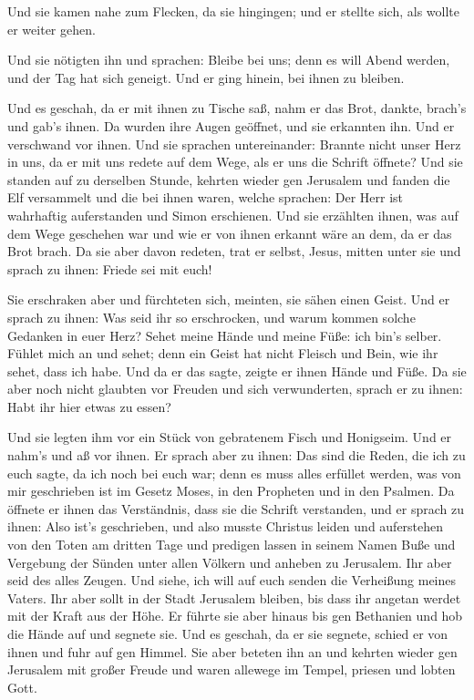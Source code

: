  Und sie kamen nahe zum Flecken, da sie hingingen; und er
stellte sich, als wollte er weiter gehen.

 Und sie nötigten ihn und sprachen: Bleibe bei uns; denn
es will Abend werden, und der Tag hat sich geneigt. Und er ging hinein,
bei ihnen zu bleiben.

 Und es geschah, da er mit ihnen zu Tische saß, nahm er
das Brot, dankte, brach's und gab's ihnen.  Da wurden
ihre Augen geöffnet, und sie erkannten ihn. Und er verschwand vor ihnen.
 Und sie sprachen untereinander: Brannte nicht unser Herz
in uns, da er mit uns redete auf dem Wege, als er uns die Schrift
öffnete?  Und sie standen auf zu derselben Stunde,
kehrten wieder gen Jerusalem und fanden die Elf versammelt und die bei
ihnen waren,  welche sprachen: Der Herr ist wahrhaftig
auferstanden und Simon erschienen.  Und sie erzählten
ihnen, was auf dem Wege geschehen war und wie er von ihnen erkannt wäre
an dem, da er das Brot brach.  Da sie aber davon redeten,
trat er selbst, Jesus, mitten unter sie und sprach zu ihnen: Friede sei
mit euch!

 Sie erschraken aber und fürchteten sich, meinten, sie
sähen einen Geist.  Und er sprach zu ihnen: Was seid ihr
so erschrocken, und warum kommen solche Gedanken in euer Herz?
 Sehet meine Hände und meine Füße: ich bin's selber.
Fühlet mich an und sehet; denn ein Geist hat nicht Fleisch und Bein, wie
ihr sehet, dass ich habe.  Und da er das sagte, zeigte er
ihnen Hände und Füße.  Da sie aber noch nicht glaubten
vor Freuden und sich verwunderten, sprach er zu ihnen: Habt ihr hier
etwas zu essen?

 Und sie legten ihm vor ein Stück von gebratenem Fisch
und Honigseim.  Und er nahm's und aß vor ihnen.
 Er sprach aber zu ihnen: Das sind die Reden, die ich zu
euch sagte, da ich noch bei euch war; denn es muss alles erfüllet
werden, was von mir geschrieben ist im Gesetz Moses, in den Propheten
und in den Psalmen.  Da öffnete er ihnen das Verständnis,
dass sie die Schrift verstanden,  und er sprach zu ihnen:
Also ist's geschrieben, und also musste Christus leiden und auferstehen
von den Toten am dritten Tage  und predigen lassen in
seinem Namen Buße und Vergebung der Sünden unter allen Völkern und
anheben zu Jerusalem.  Ihr aber seid des alles Zeugen.
 Und siehe, ich will auf euch senden die Verheißung
meines Vaters. Ihr aber sollt in der Stadt Jerusalem bleiben, bis dass
ihr angetan werdet mit der Kraft aus der Höhe.  Er führte
sie aber hinaus bis gen Bethanien und hob die Hände auf und segnete sie.
 Und es geschah, da er sie segnete, schied er von ihnen
und fuhr auf gen Himmel.  Sie aber beteten ihn an und
kehrten wieder gen Jerusalem mit großer Freude  und waren
allewege im Tempel, priesen und lobten Gott.
